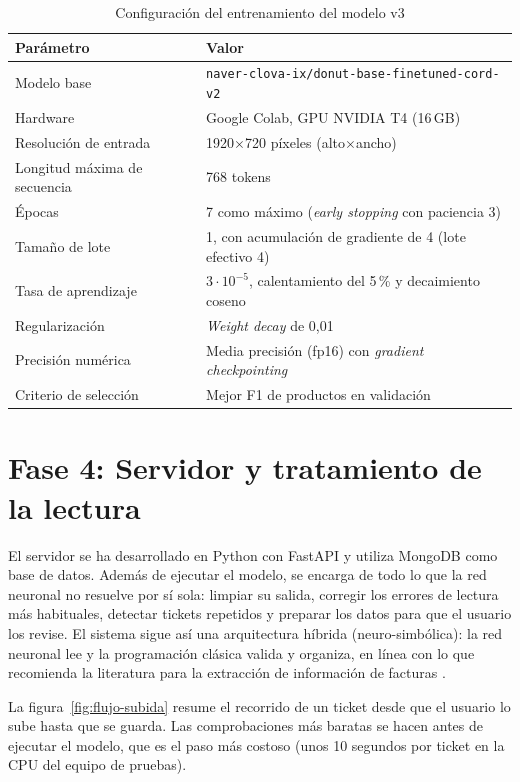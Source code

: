 \begin{table}[htbp]
    \caption{\label{tab:hiperparametros}Configuración del entrenamiento del modelo v3}
    \begin{tabularx}{\textwidth}{@{}lX@{}}
        \toprule
        \textbf{Parámetro} & \textbf{Valor} \\
        \midrule
        Modelo base & \texttt{naver-clova-ix/donut-base-finetuned-cord-v2} \\
        Hardware & Google Colab, GPU NVIDIA T4 (16\,GB) \\
        Resolución de entrada & 1920$\times$720 píxeles (alto$\times$ancho) \\
        Longitud máxima de secuencia & 768 tokens \\
        Épocas & 7 como máximo (\textit{early stopping} con paciencia 3) \\
        Tamaño de lote & 1, con acumulación de gradiente de 4 (lote efectivo 4) \\
        Tasa de aprendizaje & $3\cdot10^{-5}$, calentamiento del 5\,\% y decaimiento coseno \\
        Regularización & \textit{Weight decay} de 0,01 \\
        Precisión numérica & Media precisión (fp16) con \textit{gradient checkpointing} \\
        Criterio de selección & Mejor F1 de productos en validación \\
        \bottomrule
    \end{tabularx}
\end{table}

\section{Fase 4: Servidor y tratamiento de la lectura}
\label{s:servidor}

El servidor se ha desarrollado en Python con FastAPI y utiliza MongoDB como base de datos. Además de ejecutar el modelo, se encarga de todo lo que la red neuronal no resuelve por sí sola: limpiar su salida, corregir los errores de lectura más habituales, detectar tickets repetidos y preparar los datos para que el usuario los revise. El sistema sigue así una arquitectura híbrida (neuro-simbólica): la red neuronal lee y la programación clásica valida y organiza, en línea con lo que recomienda la literatura para la extracción de información de facturas \parencite{maciel2022extraccion}.

La figura~\ref{fig:flujo-subida} resume el recorrido de un ticket desde que el usuario lo sube hasta que se guarda. Las comprobaciones más baratas se hacen antes de ejecutar el modelo, que es el paso más costoso (unos 10 segundos por ticket en la CPU del equipo de pruebas).


